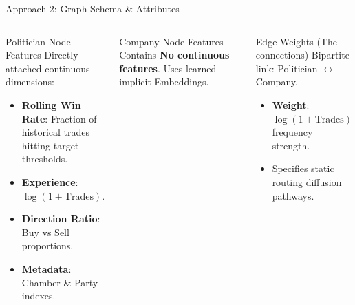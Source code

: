 \documentclass[aspectratio=169,11pt]{beamer}
\begin{document}
\begin{frame}{Approach 2: Graph Schema \& Attributes}

  \begin{columns}[T]
      \begin{block}{Politician Node Features}
        \footnotesize
        Directly attached continuous dimensions:
        \begin{itemize}
          \item \textbf{Rolling Win Rate}: Fraction of historical trades hitting target thresholds.
          \item \textbf{Experience}: $\log(1 + \text{Trades})$.
          \item \textbf{Direction Ratio}: Buy vs Sell proportions.
          \item \textbf{Metadata}: Chamber \& Party indexes.
        \end{itemize}
      \end{block}

      \begin{block}{Company Node Features}
        \footnotesize
        Contains \textbf{No continuous features}.
        Uses learned implicit Embeddings.
      \end{block}

      \begin{block}{Edge Weights (The connections)}
        \footnotesize
        Bipartite link: Politician $\leftrightarrow$ Company.
        \begin{itemize}
          \item \textbf{Weight}: $\log(1 + \text{Trades})$ frequency strength.
          \item Specifies static routing diffusion pathways.
        \end{itemize}
      \end{block}
  \end{columns}

\end{frame}
\end{document}

